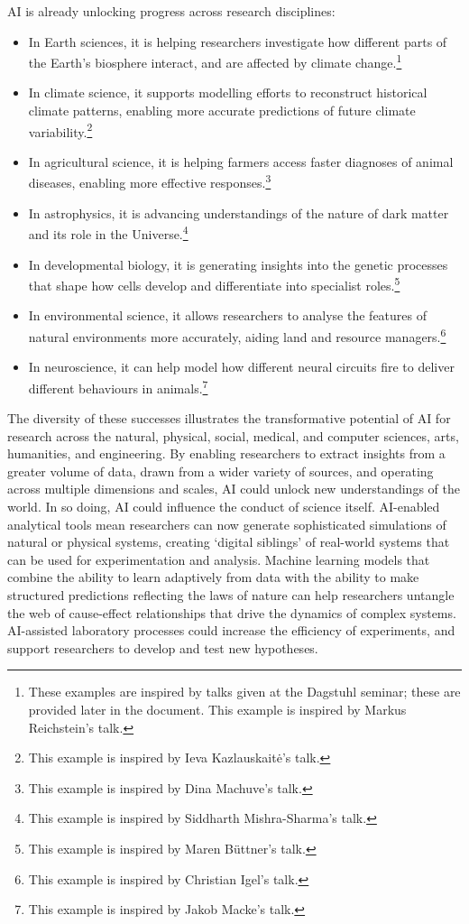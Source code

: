AI is already unlocking progress across research disciplines:

\begin{itemize}
\item
  In Earth sciences, it is helping researchers investigate how different
  parts of the Earth's biosphere interact, and are affected by climate
  change.\footnote{These examples are inspired by talks given at the
    Dagstuhl seminar; these are provided later in the document. This
    example is inspired by Markus Reichstein's talk.}
\item
  In climate science, it supports modelling efforts to reconstruct
  historical climate patterns, enabling more accurate predictions of
  future climate variability.\footnote{This example is inspired by Ieva
    Kazlauskaitė's talk.}
\item
  In agricultural science, it is helping farmers access faster diagnoses
  of animal diseases, enabling more effective responses.\footnote{This
    example is inspired by Dina Machuve's talk.}
\item
  In astrophysics, it is advancing understandings of the nature of dark
  matter and its role in the Universe.\footnote{This example is inspired
    by Siddharth Mishra-Sharma's talk.}
\item
  In developmental biology, it is generating insights into the genetic
  processes that shape how cells develop and differentiate into
  specialist roles.\footnote{This example is inspired by Maren Büttner's
    talk.}
\item
  In environmental science, it allows researchers to analyse the
  features of natural environments more accurately, aiding land and
  resource managers.\footnote{This example is inspired by Christian
    Igel's talk.}
\item
  In neuroscience, it can help model how different neural circuits fire
  to deliver different behaviours in animals.\footnote{This example is
    inspired by Jakob Macke's talk.}
\end{itemize}

The diversity of these successes illustrates the transformative
potential of AI for research across the natural, physical, social,
medical, and computer sciences, arts, humanities, and engineering. By
enabling researchers to extract insights from a greater volume of data,
drawn from a wider variety of sources, and operating across multiple
dimensions and scales, AI could unlock new understandings of the world.
In so doing, AI could influence the conduct of science itself.
AI-enabled analytical tools mean researchers can now generate
sophisticated simulations of natural or physical systems, creating
`digital siblings' of real-world systems that can be used for
experimentation and analysis. Machine learning models that combine the
ability to learn adaptively from data with the ability to make
structured predictions reflecting the laws of nature can help
researchers untangle the web of cause-effect relationships that drive
the dynamics of complex systems. AI-assisted laboratory processes could
increase the efficiency of experiments, and support researchers to
develop and test new hypotheses.

